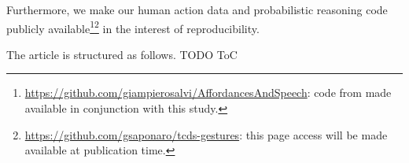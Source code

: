 Furthermore, we make our human action data and probabilistic reasoning code publicly available\footnote{\url{https://github.com/giampierosalvi/AffordancesAndSpeech}: code from \cite{salvi:2012:smcb} made available in conjunction with this study.}\footnote{\url{https://github.com/gsaponaro/tcds-gestures}: this page access will be made available at publication time.} in the interest of reproducibility.

The article is structured as follows. TODO ToC


